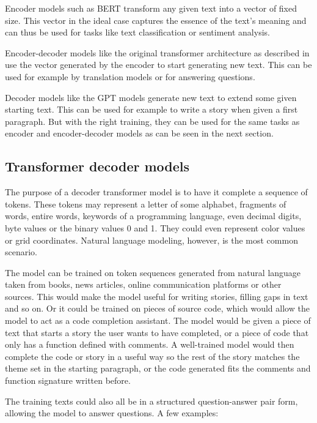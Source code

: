 Encoder models such as BERT \cite{devlin2019bert} transform any given text into a vector of fixed size. This vector in the ideal case captures the essence of the text's meaning and can thus be used for tasks like text classification or sentiment analysis.

Encoder-decoder models like the original transformer architecture as described in \cite{allyouneed} use the vector generated by the encoder to start generating new text. This can be used for example by translation models or for answering questions.

Decoder models like the GPT models \cite{improvinglu} generate new text to extend some given starting text. This can be used for example to write a story when given a first paragraph. But with the right training, they can be used for the same tasks as encoder and encoder-decoder models as can be seen in the next section.

\subsection{Transformer decoder models}

The purpose of a decoder transformer model is to have it complete a sequence of tokens. These tokens may represent a letter of some alphabet, fragments of words, entire words, keywords of a programming language, even decimal digits, byte values or the binary values 0 and 1.
They could even represent color values or grid coordinates. Natural language modeling, however, is the most common scenario.

The model can be trained on token sequences generated from natural language taken from books, news articles, online communication platforms or other sources. This would make the model useful for writing stories, filling gaps in text and so on.
Or it could be trained on pieces of source code, which would allow the model to act as a code completion assistant.
The model would be given a piece of text that starts a story the user wants to have completed, or a piece of code that only has a function defined with comments. A well-trained model would then complete the code or story in a useful way so the rest of the story matches the theme set in the starting paragraph, or the code generated fits the comments and function signature written before.

The training texts could also all be in a structured question-answer pair form, allowing the model to answer questions. A few examples:
\label{transformer:examples}

